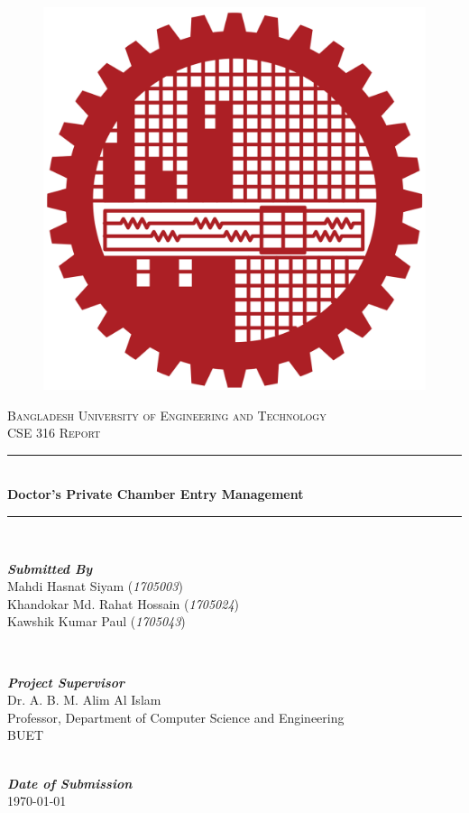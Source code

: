 \documentclass[a4paper,12pt]{article}
\begin{document}
	
	\begin{titlepage}
		\center 
		\center 
		\begin{figure}[h]
			\centering
			\includegraphics[width= 0.2\linewidth]{imgs/buet.png}
			\label{fig:buet_logo}
		\end{figure}
		\textsc{\LARGE Bangladesh University of Engineering and Technology}\\[0.8cm]
		\textsc{\Large CSE 316 Report}\\[0.5cm]
		
		\rule{\linewidth}{0.5mm} \\[0.4cm]
		
		{\Large \textbf{Doctor's Private Chamber Entry Management}}\\[0.3cm] 
		\rule{\linewidth}{0.5mm} \\[1.5cm]
		
		\begin{minipage}{1\textwidth}
			\centering \large
			\textbf{\emph{Submitted By}}\\[0.3 cm]
			Mahdi Hasnat Siyam (\emph{1705003})\\
			Khandokar Md. Rahat Hossain (\emph{1705024})\\
			Kawshik Kumar Paul (\emph{1705043})\\
		\end{minipage}\\[1.2cm]
		
		\begin{minipage}{1\textwidth}
			\centering \large
				\textbf{\emph{Project Supervisor}}\\[0.3 cm]
			Dr. A. B. M. Alim Al Islam\\
			Professor, Department of Computer Science and Engineering\\
			BUET\\
		\end{minipage}\\[1.2cm]
		
		\vspace*{\fill}
		\textbf{\large \emph{Date of Submission}\\[0.2cm]}
		{\large \today}\\[1cm]
	\end{titlepage}
	
\end{document}
